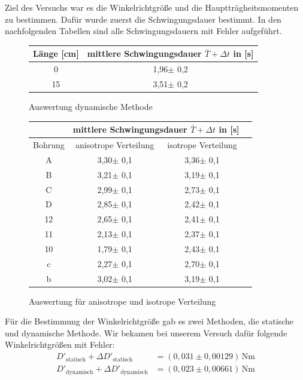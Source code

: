 \documentclass[fontsize=12pt]{scrartcl}
\begin{document}
Ziel des Versuchs war es die Winkelrichtgröße und die Hauptträgheitsmomenten zu bestimmen.
Dafür wurde zuerst die Schwingungsdauer bestimmt. In den nachfolgenden Tabellen sind alle Schwingungsdauern mit Fehler aufgeführt.
\begin{figure}[h!]
\vspace{-10pt}
\centering
\caption{Auswertung dynamische Methode}
\begin{tabular}{|c|c|} \hline
\rule{0pt}{12,5pt}Länge [cm] &mittlere Schwingungsdauer $\bar{T}+ \Delta t$ in [s]	\\ \hline
0		&1,96$\pm$ 0,2\\ \hline
15	&3,51$\pm$ 0,2	\\ \hline
\end{tabular}
\end{figure}
\begin{figure}[h!]
\vspace{-10pt}
\centering
\caption{Auswertung  für anisotrope und isotrope Verteilung}
\begin{tabular}{|c|c|c|c|} \hline
\rule{0pt}{12,5pt}&\multicolumn{2}{c|}{mittlere Schwingungsdauer $\bar{T}+\Delta t$ in [s]}\\ \hline
Bohrung & anisotrope Verteilung & isotrope Verteilung\\ \hline
A		&	3,30$\pm$ 0,1&3,36$\pm$ 0,1	\\ \hline
B		&3,21$\pm$ 0,1&3,19$\pm$ 0,1	\\ \hline
C		&2,99$\pm$ 0,1&2,73$\pm$ 0,1	\\ \hline
D		&2,85$\pm$ 0,1&2,42$\pm$ 0,1	\\ \hline
12	&2,65$\pm$ 0,1&2,41$\pm$ 0,1	\\ \hline
11		&2,13$\pm$ 0,1&2,37$\pm$ 0,1	\\ \hline
10	&1,79$\pm$ 0,1&2,43$\pm$ 0,1	\\ \hline
 c		&2,27$\pm$ 0,1&2,70$\pm$ 0,1	\\ \hline
 b		&3,02$\pm$ 0,1&3,19$\pm$ 0,1	\\ \hline
\end{tabular}
\end{figure}
\noindent
Für die Bestimmung der Winkelrichtgröße gab es zwei Methoden, die statische und dynamische Methode.
Wir bekamen bei unserem Versuch dafür folgende Winkelrichtgrößen mit Fehler:
\begin{align*}
D'_{\text{statisch}}+\Delta D'_{\text{statisch}}&= (0,031\pm0,00129)\,\text{Nm} \\
D'_{\text{dynamisch}}+\Delta D'_{\text{dynamisch}}&=( 0,023\pm0,00661)\,\text{Nm}
\end{align*}
\end{document}

